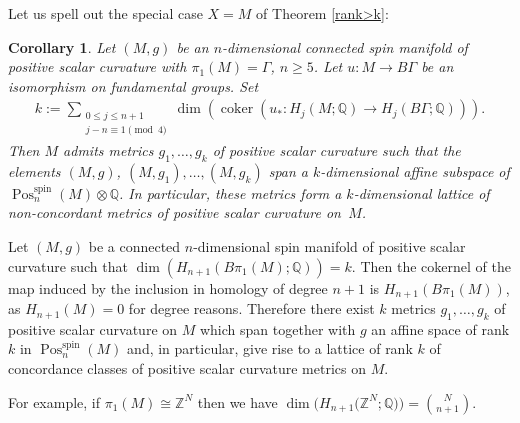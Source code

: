 \documentclass[pdftex]{sigma}
\numberwithin{equation}{section}
\newtheorem{Corollary}[Theorem]{Corollary}
\newcommand{\integers}{\mathbb{Z}}
\newcommand{\rationals}{\mathbb{Q}}
\newcommand{\tensor}{\otimes}
\newcommand{\iso}{\cong}
\DeclareMathOperator{\Pos}{Pos}
\DeclareMathOperator{\spin}{spin}
\DeclareMathOperator{\coker}{coker}
\begin{document}
Let us spell out the special case $X=M$ of Theorem \ref{rank>k}:
\begin{Corollary}\label{corol:metrics}
 Let $(M,g)$ be an $n$-dimensional connected
 spin manifold
 of positive scalar curvature with $\pi_1(M)=\Gamma$, $n\ge 5$. Let $u\colon M\to
 B\Gamma$ be an isomorphism on fundamental groups. Set
 \begin{gather*}%
 k:=\sum_{ \substack{0\le j\le n+1\\ j-n\equiv 1\pmod 4}} \dim\left(\coker(u_*\colon
 H_j(M;\rationals)\to H_j(B\Gamma;\rationals))\right).
 \end{gather*}
 Then $M$ admits metrics $g_1,\dots,g_k$ of positive scalar curvature such
 that the elements $(M,g)$, $(M,g_1), \dots, (M,g_k)$ span a $k$-dimensional affine
 subspace of $\Pos^{\spin}_n(M)\tensor\rationals$. In particular, these
 metrics form a $k$-dimensional lattice of non-concordant metrics of
 positive scalar curvature on~$M$.
\end{Corollary}

\begin{Example}
 Let $(M,g)$ be a connected $n$-dimensional spin manifold of
 positive scalar curvature such that
 $\dim(H_{n+1}(B\pi_1(M);\rationals))=k$. Then
 the cokernel of the map induced by the inclusion in homology of degree
 $n+1$ is $H_{n+1}(B\pi_1(M))$, as $H_{n+1}(M)=0$ for degree
 reasons. Therefore there exist $k$ metrics $g_1,\dots,g_k$ of
 positive scalar curvature on $M$ which span
 together with $g$ an affine space of rank $k$ in
 $\Pos^{\spin}_n(M)$ and, in particular, give rise to a lattice of
 rank $k$ of concordance classes of positive scalar curvature
 metrics on $M$.

For example, if $\pi_1(M)\iso\integers^N$ then we have
 $\dim\big(H_{n+1}\big(\integers^N;\rationals\big)\big)=\binom{N}{n+1}$.
\end{Example}
\end{document}
